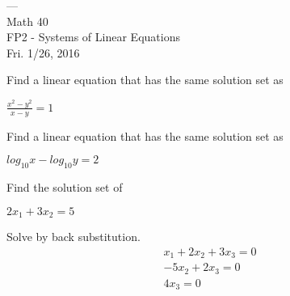 \documentclass[12pt,letterpaper]{../hmcpset}
\begin{document}
	
	\vspace*{-3\baselineskip}
	\begin{center}
		\begin{flushright} --- \\ Math 40 \\ FP2 - Systems of Linear Equations \\ Fri. 1/26, 2016 \\ 
		\end{flushright} 	
	\end{center}
	\bigskip


\begin{problem}[8]
	Find a linear equation that has the same solution set as 
	\begin{center}
		$\frac{x^2 - y^2}{x-y} = 1$
	\end{center}
\end{problem}

\begin{solution}
\end{solution}
\newpage

\begin{problem}[10]
	Find a linear equation that has the same solution set as 
	\begin{center}
		$log_{10}x - log_{10}y = 2$
	\end{center}
\end{problem}

\begin{solution}
\end{solution}
\newpage

\begin{problem}[12]
	Find the solution set of 
	\begin{center}
		$2x_1 + 3x_2 = 5$
	\end{center}
\end{problem}

\begin{solution}
\end{solution}
\newpage

\begin{problem}[22]
	Solve by back substitution.
	\begin{equation}
		\begin{split}
			x_1 + 2x_2 + 3x_3 = 0 \\
			-5x_2 + 2x_3 = 0 \\
			4x_3 = 0 		
		\end{split}
	\end{equation}
\end{problem}
\end{document}
